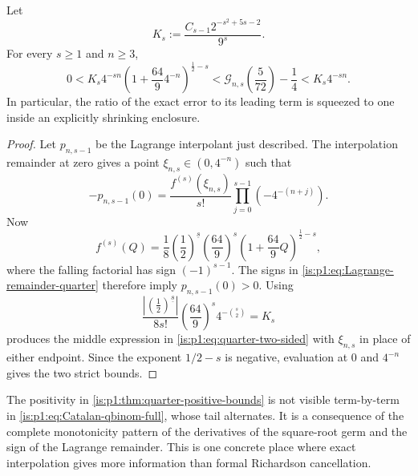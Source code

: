 \begin{theorem}
\label{is:p1:thm:quarter-positive-bounds}
Let
\begin{equation}
 K_s:=\frac{C_{s-1}2^{-s^2+5s-2}}{9^s}.
 \label{is:p1:eq:Ks-quarter}
\end{equation}
For every $s\ge1$ and $n\ge3$,
\begin{equation}
 \boxed{
 0< K_s4^{-sn}\left(1+\frac{64}{9}4^{-n}\right)^{\frac12-s}
 <\mathcal G_{n,s}\!\left(\frac5{72}\right)-\frac14
 <K_s4^{-sn}.}
 \label{is:p1:eq:quarter-two-sided}
\end{equation}
In particular, the ratio of the exact error to its leading term is squeezed to one
inside an explicitly shrinking enclosure.
\end{theorem}

\begin{proof}
Let $p_{n,s-1}$ be the Lagrange interpolant just described.  The interpolation
remainder at zero gives a point $\xi_{n,s}\in(0,4^{-n})$ such that
\begin{equation}
 -p_{n,s-1}(0)
 =\frac{f^{(s)}(\xi_{n,s})}{s!}
   \prod_{j=0}^{s-1}(-4^{-(n+j)}).
 \label{is:p1:eq:Lagrange-remainder-quarter}
\end{equation}
Now
\begin{equation}
 f^{(s)}(Q)=\frac1{8}\left(\frac12\right)^{\!\underline{s}}
 \left(\frac{64}{9}\right)^s
 \left(1+\frac{64}{9}Q\right)^{\frac12-s},
 \label{is:p1:eq:f-quarter-derivative}
\end{equation}
where the falling factorial has sign $(-1)^{s-1}$.  The signs in
\eqref{is:p1:eq:Lagrange-remainder-quarter} therefore imply $p_{n,s-1}(0)>0$.
Using
\begin{equation}
 \frac{\left|\left(\frac12\right)^{\!\underline{s}}\right|}{8s!}
 \left(\frac{64}{9}\right)^s4^{-\binom s2}=K_s
 \label{is:p1:eq:Ks-identity}
\end{equation}
produces the middle expression in \eqref{is:p1:eq:quarter-two-sided} with
$\xi_{n,s}$ in place of either endpoint.  Since the exponent $1/2-s$ is
negative, evaluation at $0$ and $4^{-n}$ gives the two strict bounds.
\end{proof}

\begin{remark}
The positivity in \cref{is:p1:thm:quarter-positive-bounds} is not visible term-by-term in
\eqref{is:p1:eq:Catalan-qbinom-full}, whose tail alternates.  It is a consequence of the
complete monotonicity pattern of the derivatives of the square-root germ and the sign
of the Lagrange remainder.  This is one concrete place where exact interpolation gives
more information than formal Richardson cancellation.
\end{remark}

